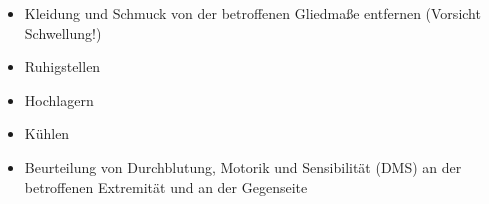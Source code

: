 \label{m:verstauchung}
\begin{itemize}
  \item Kleidung und Schmuck von der betroffenen Gliedmaße entfernen
  (Vorsicht Schwellung!)
  \item Ruhigstellen
  \item Hochlagern
  \item Kühlen
  \item Beurteilung von Durchblutung, Motorik und
  Sensibilität (DMS) an der betroffenen Extremität und an
  der Gegenseite
\end{itemize}